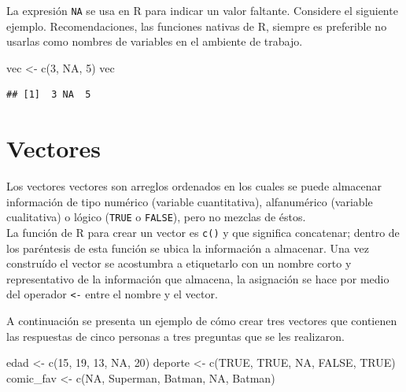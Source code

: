 \documentclass[
]{book}
\newenvironment{Shaded}{\begin{snugshade}}{\end{snugshade}}
\newcommand{\ConstantTok}[1]{\textcolor[rgb]{0.00,0.00,0.00}{#1}}
\newcommand{\DecValTok}[1]{\textcolor[rgb]{0.00,0.00,0.81}{#1}}
\newcommand{\FunctionTok}[1]{\textcolor[rgb]{0.00,0.00,0.00}{#1}}
\newcommand{\NormalTok}[1]{#1}
\newcommand{\OtherTok}[1]{\textcolor[rgb]{0.56,0.35,0.01}{#1}}
\newcommand{\StringTok}[1]{\textcolor[rgb]{0.31,0.60,0.02}{#1}}
\begin{document}
La expresión \texttt{NA} se usa en R para indicar un valor faltante. Considere el siguiente ejemplo. Recomendaciones, las funciones nativas de R, siempre es preferible no usarlas como nombres de variables en el ambiente de trabajo.

\begin{Shaded}
\begin{Highlighting}[]
\NormalTok{vec }\OtherTok{\textless{}{-}} \FunctionTok{c}\NormalTok{(}\DecValTok{3}\NormalTok{, }\ConstantTok{NA}\NormalTok{, }\DecValTok{5}\NormalTok{)}
\NormalTok{vec}
\end{Highlighting}
\end{Shaded}

\begin{verbatim}
## [1]  3 NA  5
\end{verbatim}

\hypertarget{vectores}{%
\section{\texorpdfstring{Vectores  \label{vector}}{Vectores  }}\label{vectores}}

Los vectores vectores son arreglos ordenados en los cuales se puede almacenar información de tipo numérico (variable cuantitativa), alfanumérico (variable cualitativa) o lógico (\texttt{TRUE} o \texttt{FALSE}), pero no mezclas de éstos.\\
La función de R para crear un vector es \texttt{c()} y que significa concatenar; dentro de los paréntesis de esta función se ubica la información a almacenar. Una vez construído el vector se acostumbra a etiquetarlo con un nombre corto y representativo de la información que almacena, la asignación se hace por medio del operador \texttt{\textless{}-} entre el nombre y el vector.

A continuación se presenta un ejemplo de cómo crear tres vectores que contienen las respuestas de cinco personas a tres preguntas que se les realizaron.

\begin{Shaded}
\begin{Highlighting}[]
\NormalTok{edad }\OtherTok{\textless{}{-}} \FunctionTok{c}\NormalTok{(}\DecValTok{15}\NormalTok{, }\DecValTok{19}\NormalTok{, }\DecValTok{13}\NormalTok{, }\ConstantTok{NA}\NormalTok{, }\DecValTok{20}\NormalTok{)}
\NormalTok{deporte }\OtherTok{\textless{}{-}} \FunctionTok{c}\NormalTok{(}\ConstantTok{TRUE}\NormalTok{, }\ConstantTok{TRUE}\NormalTok{, }\ConstantTok{NA}\NormalTok{, }\ConstantTok{FALSE}\NormalTok{, }\ConstantTok{TRUE}\NormalTok{)}
\NormalTok{comic\_fav }\OtherTok{\textless{}{-}} \FunctionTok{c}\NormalTok{(}\ConstantTok{NA}\NormalTok{, }\StringTok{\textquotesingle{}Superman\textquotesingle{}}\NormalTok{, }\StringTok{\textquotesingle{}Batman\textquotesingle{}}\NormalTok{, }\ConstantTok{NA}\NormalTok{, }\StringTok{\textquotesingle{}Batman\textquotesingle{}}\NormalTok{)}
\end{Highlighting}
\end{Shaded}
\end{document}
